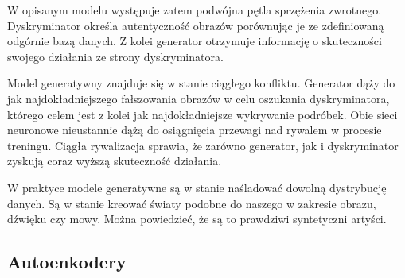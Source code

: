    W opisanym modelu występuje zatem podwójna pętla sprzężenia zwrotnego. Dyskryminator określa autentyczność obrazów porównując je ze zdefiniowaną odgórnie bazą danych. Z kolei generator otrzymuje informację o skuteczności swojego działania ze strony dyskryminatora.

   Model generatywny znajduje się w stanie ciągłego konfliktu. Generator dąży do jak najdokładniejszego fałszowania obrazów w celu oszukania dyskryminatora, którego celem jest z kolei jak najdokładniejsze wykrywanie podróbek. Obie sieci neuronowe nieustannie dążą do osiągnięcia przewagi nad rywalem w procesie treningu. Ciągła rywalizacja sprawia, że zarówno generator, jak i dyskryminator zyskują coraz wyższą skuteczność działania.

   W praktyce modele generatywne są w stanie naśladować dowolną dystrybucję danych. Są w stanie kreować światy podobne do naszego w zakresie obrazu, dźwięku czy mowy. Można powiedzieć, że są to prawdziwi syntetyczni artyści.

   \subsection{Autoenkodery}
   \label{autoenkodery}
